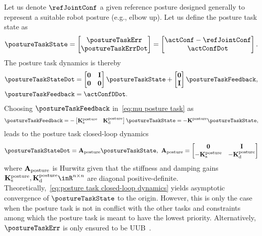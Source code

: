 	Let us denote $\refJointConf$ a given reference posture designed generally to represent a suitable robot posture (e.g., elbow up). Let us define the posture task state as 
	\begin{equation}
		\postureTaskState = \begin{bmatrix}
			\postureTaskErr \\ \postureTaskErrDot
		\end{bmatrix} = 
		\begin{bmatrix}
			\actConf - \refJointConf \\ \actConfDot
		\end{bmatrix}.
	\end{equation} 
	The posture task dynamics is thereby 
	\begin{align}
		\postureTaskStateDot &= \begin{bmatrix}
			\mathbf{0}& \mathbf{I} \\ \mathbf{0}&\mathbf{0}
		\end{bmatrix}\postureTaskState + \begin{bmatrix}
			\mathbf{0} \\ \mathbf{I} 
		\end{bmatrix}\postureTaskFeedback, \\
		\label{eq:mu posture task}\postureTaskFeedback&=\actConfDDot.
	\end{align}
	Choosing $\postureTaskFeedback$ in~\eqref{eq:mu posture task} as 
	\begin{equation}
		\postureTaskFeedback = -\begin{bmatrix}
			\mathbf{K}_{\rm s}^{\rm posture} & \mathbf{K}_{\rm d}^{\rm posture}
		\end{bmatrix}\postureTaskState = -\mathbf{K}^{\rm posture}\postureTaskState,
	\end{equation}
	leads to the posture task closed-loop dynamics
	\begin{equation}\label{eq:posture task closed-loop dynamics}
		\postureTaskStateDot = \mathbf{A}_{\rm posture}\postureTaskState, \ \mathbf{A}_{\rm posture} = \begin{bmatrix}
			\mathbf{0}& \mathbf{I} \\ -\mathbf{K}_{\rm s}^{\rm posture} & -\mathbf{K}_{\rm d}^{\rm posture}
		\end{bmatrix}
	\end{equation}
	where $\mathbf{A}_{\rm posture}$ is Hurwitz given that the stiffness and damping gains $\mathbf{K}_{\rm s}^{\rm posture},\mathbf{K}_{\rm d}^{\rm posture}\inR^{n\times n}$ are diagonal positive-definite. Theoretically,~\eqref{eq:posture task closed-loop dynamics} yields asymptotic convergence of $\postureTaskState$ to the origin. However, this is only the case when the posture task is not in conflict with the other tasks and constraints among which the posture task is meant to have the lowest priority. Alternatively, $\postureTaskErr$ is only ensured to be UUB~\cite{bouyarmane2018tac}.
